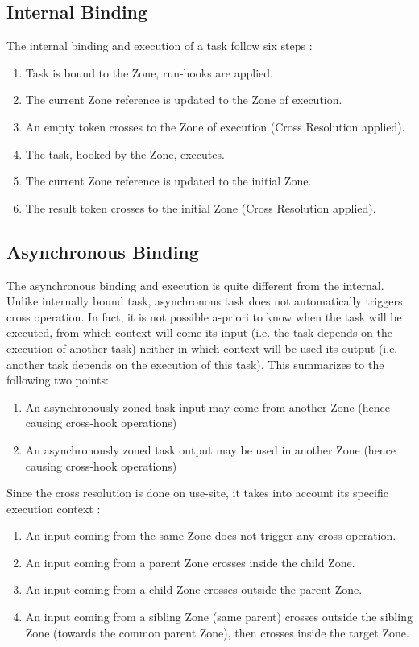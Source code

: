 \subsection*{Internal Binding}

The internal binding and execution of a task follow six steps :
\begin{enumerate}
\item Task is bound to the Zone, run-hooks are applied.
\item The current Zone reference is updated to the Zone of execution.
\item An empty token crosses to the Zone of execution (Cross Resolution applied).
\item The task, hooked by the Zone, executes.
\item The current Zone reference is updated to the initial Zone.
\item The result token crosses to the initial Zone (Cross Resolution applied).
\end{enumerate}

\subsection*{Asynchronous Binding}

The asynchronous binding and execution is quite different from the internal. Unlike internally bound task, asynchronous task does not automatically triggers cross operation. In fact, it is not possible a-priori to know when the task will be executed, from which context will come its input (i.e. the task depends on the execution of another task) neither in which context will be used its output (i.e. another task depends on the execution of this task). This summarizes to the following two points:
\begin{enumerate}
\item An asynchronously zoned task input may come from another Zone (hence causing cross-hook operations)
\item An asynchronously zoned task output may be used in another Zone (hence causing cross-hook operations)
\end{enumerate}

Since the cross resolution is done on use-site, it takes into account its specific execution context :
\begin{enumerate}
\item An input coming from the same Zone does not trigger any cross operation.
\item An input coming from a parent Zone crosses inside the child Zone.
\item An input coming from a child Zone crosses outside the parent Zone.
\item An input coming from a sibling Zone (same parent) crosses outside the sibling Zone (towards the common parent Zone), then crosses inside the target Zone.
\end{enumerate}

